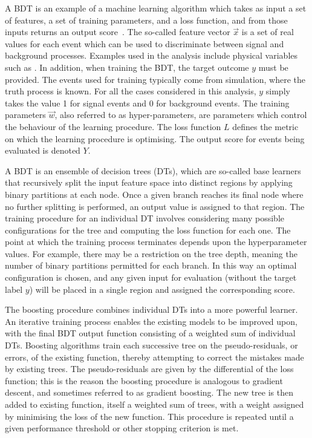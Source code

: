 A BDT is an example of a machine learning algorithm which takes as input a set of features, 
a set of training parameters, and a loss function, 
and from those inputs returns an output score~\cite{ElementsLearning}.
The so-called feature vector $\vec{x}$ is a set of real values for each event
which can be used to discriminate between signal and background processes. 
Examples used in the analysis include physical variables such as \pt.
In addition, when training the BDT, the target outcome $y$ must be provided.
The events used for training typically come from simulation, where the truth process is known.
For all the cases considered in this analysis, $y$ simply takes the value 1 for signal events
and 0 for background events.
The training parameters $\vec{w}$, also referred to as hyper-parameters, 
are parameters which control the behaviour of the learning procedure.
The loss function $L$ defines the metric on which the learning procedure is optimising.
The output score for events being evaluated is denoted $Y$.

A BDT is an ensemble of decision trees (DTs), 
which are so-called base learners that recursively split the input feature space into distinct regions
by applying binary partitions at each node.
Once a given branch reaches its final node where no further splitting is performed, 
an output value is assigned to that region.
The training procedure for an individual DT involves considering many possible configurations
for the tree and computing the loss function for each one.
The point at which the training process terminates depends upon the hyperparameter values.
For example, there may be a restriction on the tree depth, 
meaning the number of binary partitions permitted for each branch.
In this way an optimal configuration is chosen, 
and any given input for evaluation (without the target label $y$) 
will be placed in a single region and assigned the corresponding score.

The boosting procedure combines individual DTs into a more powerful learner.
An iterative training process enables the existing models to be improved upon, 
with the final BDT output function consisting of a weighted sum of individual DTs.
Boosting algorithms train each successive tree on the pseudo-residuals, or errors, 
of the existing function, thereby attempting to correct the mistakes made by existing trees.
The pseudo-residuals are given by the differential of the loss function; 
this is the reason the boosting procedure is analogous to gradient descent, 
and sometimes referred to as gradient boosting.
The new tree is then added to existing function, itself a weighted sum of trees, 
with a weight assigned by minimising the loss of the new function.
This procedure is repeated until a given performance threshold or other stopping criterion is met.

